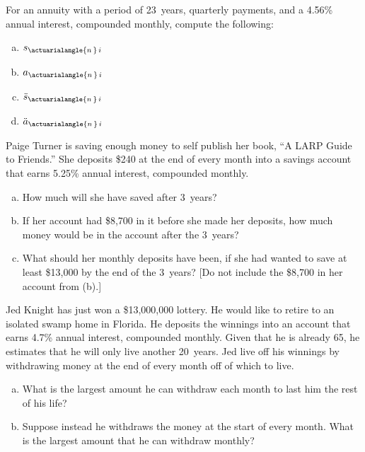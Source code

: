 \documentclass[11pt,letterpaper]{article}
\begin{document}

 For an annuity with a period of 23~years, quarterly payments, and a 4.56\% annual interest, compounded monthly, compute the following:
	\begin{enumerate}[(a)]
	\item $s_{\actuarialangle{n\,}\, i}$
	\item $a_{\actuarialangle{n\,}\, i}$
	\item $\ddot{s}_{\actuarialangle{n\,}\, i}$
	\item $\ddot{a}_{\actuarialangle{n\,}\, i}$
	\end{enumerate}



\newpage



 Paige Turner is saving enough money to self publish her book, ``A LARP Guide to Friends.'' She deposits \$240 at the end of every month into a savings account that earns 5.25\% annual interest, compounded monthly. 
	\begin{enumerate}[(a)]
	\item How much will she have saved after 3~years?
	\item If her account had \$8,700 in it before she made her deposits, how much money would be in the account after the 3~years?
	\item What should her monthly deposits have been, if she had wanted to save at least \$13,000 by the end of the 3~years? [Do not include the \$8,700 in her account from (b).]
	\end{enumerate}



\newpage



 Jed Knight has just won a \$13,000,000 lottery. He would like to retire to an isolated swamp home in Florida. He deposits the winnings into an account that earns 4.7\% annual interest, compounded monthly. Given that he is already 65, he estimates that he will only live another 20~years. Jed live off his winnings by withdrawing money at the end of every month off of which to live.
	\begin{enumerate}[(a)]
	\item  What is the largest amount he can withdraw each month to last him the rest of his life?
	\item Suppose instead he withdraws the money at the start of every month. What is the largest amount that he can withdraw monthly? 
	\end{enumerate}
\end{document}
